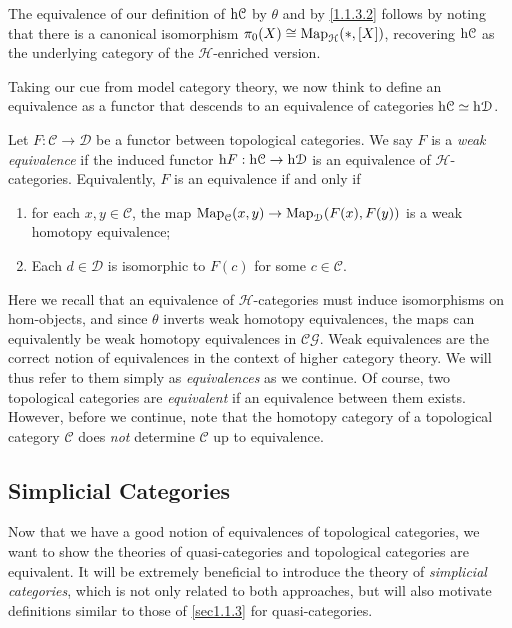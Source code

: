\begin{remark}\label{1.1.3.6}
	The equivalence of our definition of $\mathrm{h}\mathcal{C} $ by $\theta$ and by \cref{1.1.3.2} follows by noting that there is a canonical isomorphism $\pi_0(X)\cong \operatorname{Map}_\mathcal{H} (*,[X])$, recovering $\mathrm{h}\mathcal{C} $ as the underlying category of the $\mathcal{H} $-enriched version.
\end{remark}

Taking our cue from model category theory, we now think to define an equivalence as a functor that descends to an equivalence of categories $\mathrm{h}\mathcal{C} \simeq\mathrm{h}\mathcal{D}$.

\begin{definition}\label{1.1.3.7}
	Let $F : \mathcal{C}  \to \mathcal{D} $ be a functor between topological categories. We say $F$ is a \emph{weak equivalence} if the induced functor $\mathrm{h} F : \mathrm{h}\mathcal{C} \to \mathrm{h}\mathcal{D} $ is an equivalence of $\mathcal{H} $-categories. Equivalently, $F$ is an equivalence if and only if
	\begin{enumerate}
		\item for each $x,y\in \mathcal{C} $, the map $\operatorname{Map} _\mathcal{C} (x,y)\to \operatorname{Map} _\mathcal{D} (F(x),F(y))$ is a weak homotopy equivalence;
		\item Each $d\in \mathcal{D} $ is isomorphic to $F(c)$ for some $c\in \mathcal{C} $.
	\end{enumerate}
\end{definition}

Here we recall that an equivalence of $\mathcal{H} $-categories must induce isomorphisms on hom-objects, and since $\theta$ inverts weak homotopy equivalences, the maps can equivalently be weak homotopy equivalences in $\mathcal{C} \mathcal{G} $. Weak equivalences are the correct notion of equivalences in the context of higher category theory. We will thus refer to them simply as \emph{equivalences} as we continue. Of course, two topological categories are \emph{equivalent} if an equivalence between them exists. However, before we continue, note that the homotopy category of a topological category $\mathcal{C} $ does \emph{not} determine $\mathcal{C} $ up to equivalence.

\subsection{Simplicial Categories}\label{sec1.1.4}

Now that we have a good notion of equivalences of topological categories, we want to show the theories of quasi-categories and topological categories are equivalent. It will be extremely beneficial to introduce the theory of \emph{simplicial categories}, which is not only related to both approaches, but will also motivate definitions similar to those of \cref{sec1.1.3} for quasi-categories.

